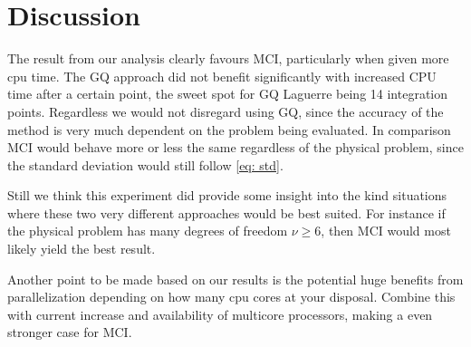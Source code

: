 \section{Discussion}
The result from our analysis clearly favours MCI, particularly when
given more cpu time. The GQ approach did not benefit significantly with
increased 
CPU time after a certain point, the sweet spot for GQ Laguerre being 14
integration points. Regardless we would not disregard using GQ, since the
accuracy of the method is very much dependent on the problem being evaluated.
In comparison MCI would behave more or less the same regardless of the physical
problem, since the standard deviation would still follow \cref{eq: std}. 

Still we think this experiment did provide some insight into the kind situations where
these two very different approaches would be best suited. For instance if the
physical problem has many degrees of freedom $\nu \ge 6 $, then MCI would most
likely yield the best result.    

Another point to be made based on our results is the potential huge benefits
from parallelization depending on how many cpu cores at your disposal. Combine
this with current increase and availability of multicore processors, making a
even stronger case for MCI. 